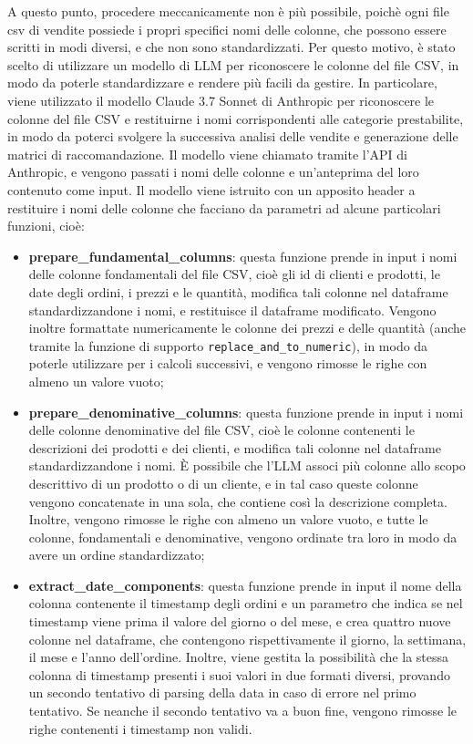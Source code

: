 A questo punto, procedere meccanicamente non è più possibile, poichè ogni file csv di vendite possiede i propri specifici nomi delle colonne, che possono essere scritti in modi diversi, e che non sono standardizzati. Per questo motivo, è stato scelto di utilizzare un modello di LLM per riconoscere le colonne del file CSV, in modo da poterle standardizzare e rendere più facili da gestire. In particolare, viene utilizzato il modello Claude 3.7 Sonnet di Anthropic per riconoscere le colonne del file CSV e restituirne i nomi corrispondenti alle categorie prestabilite, in modo da poterci svolgere la successiva analisi delle vendite e generazione delle matrici di raccomandazione. Il modello viene chiamato tramite l'API di Anthropic, e vengono passati i nomi delle colonne e un'anteprima del loro contenuto come input. Il modello viene istruito con un apposito header a restituire i nomi delle colonne che facciano da parametri ad alcune particolari funzioni, cioè:
\begin{itemize}
    \item \textbf{prepare\_fundamental\_columns}: questa funzione prende in input i nomi delle colonne fondamentali del file CSV, cioè gli id di clienti e prodotti, le date degli ordini, i prezzi e le quantità, modifica tali colonne nel dataframe standardizzandone i nomi, e restituisce il dataframe modificato. Vengono inoltre formattate numericamente le colonne dei prezzi e delle quantità (anche tramite la funzione di supporto \texttt{replace\_and\_to\_numeric}), in modo da poterle utilizzare per i calcoli successivi, e vengono rimosse le righe con almeno un valore vuoto;
    \item \textbf{prepare\_denominative\_columns}: questa funzione prende in input i nomi delle colonne denominative del file CSV, cioè le colonne contenenti le descrizioni dei prodotti e dei clienti, e modifica tali colonne nel dataframe standardizzandone i nomi. È possibile che l'LLM associ più colonne allo scopo descrittivo di un prodotto o di un cliente, e in tal caso queste colonne vengono concatenate in una sola, che contiene così la descrizione completa. Inoltre, vengono rimosse le righe con almeno un valore vuoto, e tutte le colonne, fondamentali e denominative, vengono ordinate tra loro in modo da avere un ordine standardizzato;
    \item \textbf{extract\_date\_components}: questa funzione prende in input il nome della colonna contenente il timestamp degli ordini e un parametro che indica se nel timestamp viene prima il valore del giorno o del mese, e crea quattro nuove colonne nel dataframe, che contengono rispettivamente il giorno, la settimana, il mese e l'anno dell'ordine. Inoltre, viene gestita la possibilità che la stessa colonna di timestamp presenti i suoi valori in due formati diversi, provando un secondo tentativo di parsing della data in caso di errore nel primo tentativo. Se neanche il secondo tentativo va a buon fine, vengono rimosse le righe contenenti i timestamp non validi.
\end{itemize}

